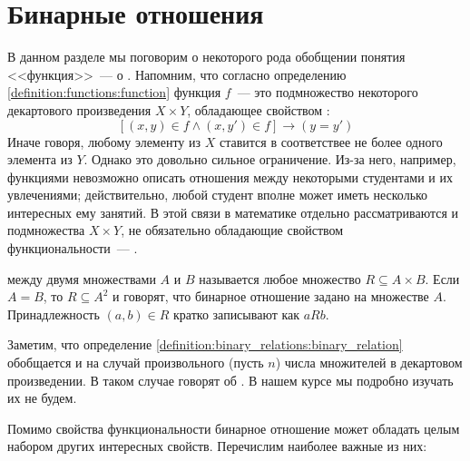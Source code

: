 \section{Бинарные отношения}
\label{sec:binary_relations}

В данном разделе мы поговорим о некоторого рода обобщении понятия <<функция>>~--- о .
Напомним, что согласно определению \ref{definition:functions:function} функция $ f $~---
это подмножество некоторого декартового произведения $ X \times Y $,
обладающее свойством :
\[
    \left[ (x, y) \in f \wedge (x, y') \in f \right] \rightarrow (y = y')
\]
Иначе говоря, любому элементу из $ X $ ставится в соответствее не более одного элемента из $ Y $.
Однако это довольно сильное ограничение.
Из-за него, например, функциями невозможно описать отношения между некоторыми студентами и их увлечениями;
действительно, любой студент вполне может иметь несколько интересных ему занятий.
В этой связи в математике отдельно рассматриваются и подмножества $ X \times Y $,
не обязательно обладающие свойством функциональности~--- .

\begin{definition}
    \label{definition:binary_relations:binary_relation}
     между двумя множествами $ A $ и $ B $ называется любое множество $ R \subseteq A \times B $.
    Если $ A = B $, то $ R \subseteq A^2 $ и говорят, что бинарное отношение задано на множестве $ A $.
    \newline
    Принадлежность $ (a, b) \in R $ кратко записывают как $ a R b $.
\end{definition}

\begin{remark}
    Заметим, что определение \ref{definition:binary_relations:binary_relation} обобщается и на случай произвольного (пусть $ n $) числа множителей в декартовом произведении.
    В таком случае говорят об .
    В нашем курсе мы подробно изучать их не будем.
\end{remark}

Помимо свойства функциональности бинарное отношение может обладать целым набором других интересных свойств.
Перечислим наиболее важные из них:

